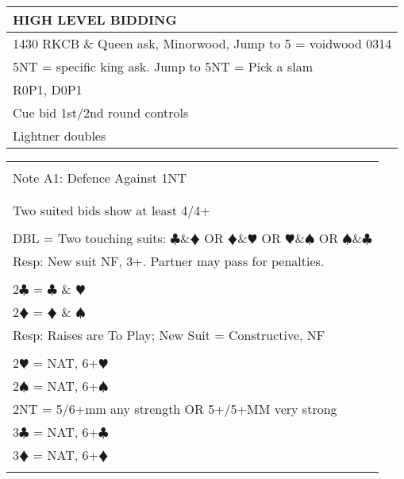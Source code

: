 \documentclass{article}
\newcommand\C{\ensuremath{\clubsuit}}
\newcommand\D{\color{red}\ensuremath{\vardiamondsuit}}
\renewcommand\H{\color{red}\ensuremath{\varheartsuit}}
\renewcommand\S{\ensuremath{\spadesuit}}
\newcommand\N{{\footnotesize NT}}
\begin{document}
\noindent
\begin{tabular}{| p{284mm} |}
	\hline
	\cellcolor{green!25} \textbf{HIGH LEVEL BIDDING}  \\ \hline
	1430 RKCB \& Queen ask, Minorwood, Jump to 5 = voidwood 0314\\ \hline
	5NT = specific king ask. Jump to 5NT = Pick a slam\\ \hline
	R0P1, D0P1 \\ \hline
	Cue bid 1st/2nd round controls \\ \hline
	Lightner doubles  \\ \hline

\end{tabular}


\begin{tabular}{|l|}
\hline \\[-1em]
\cellcolor{green!25} \Large Note A1: Defence Against 1NT \\[-1em] 
\\ \hline
\\
\Large Two suited bids show at least 4/4+  \\
\\
\Large DBL = Two touching suits: {\C}\&{\D} OR {\D}\&{\H} OR {\H}\&{\S} OR {\S}\&{\C} \\ 
\large Resp: New suit NF, 3+. Partner may pass for penalties. \\
\\
\Large 2{\C} = {\C} \& {\H} \\
\Large 2{\D} = {\D} \& {\S} \\
\large Resp: Raises are To Play; New Suit = Constructive, NF \\
\\
\Large 2{\H} = NAT, 6+{\H} \\
\Large 2{\S} = NAT, 6+{\S} \\
\Large 2{\N} = 5/6+mm any strength OR 5+/5+MM very strong\\ 
\Large 3{\C} = NAT, 6+{\C} \\
\Large 3{\D} = NAT, 6+{\D} \\
\\ \hline
\end{tabular}
\end{document}
